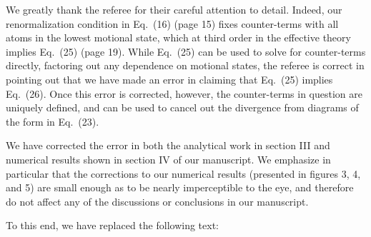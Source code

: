 \documentclass[preprint,showkeys,nofootinbib]{revtex4-1}
\newcommand{\1}{\mathds{1}}
\begin{document}
\begin{enumerate}
  We greatly thank the referee for their careful attention to detail.
  Indeed, our renormalization condition in Eq.~(16) (page 15) fixes
  counter-terms with all atoms in the lowest motional state, which at
  third order in the effective theory implies Eq.~(25) (page 19).
  While Eq.~(25) can be used to solve for counter-terms directly,
  factoring out any dependence on motional states, the referee is
  correct in pointing out that we have made an error in claiming that
  Eq.~(25) implies Eq.~(26).  Once this error is corrected, however,
  the counter-terms in question are uniquely defined, and can be used
  to cancel out the divergence from diagrams of the form in Eq.~(23).

  We have corrected the error in both the analytical work in section
  III and numerical results shown in section IV of our manuscript.  We
  emphasize in particular that the corrections to our numerical
  results (presented in figures 3, 4, and 5) are small enough as to be
  nearly imperceptible to the eye, and therefore do not affect any of
  the discussions or conclusions in our manuscript.

  To this end, we have replaced the following text:


\end{enumerate}
\end{document}
